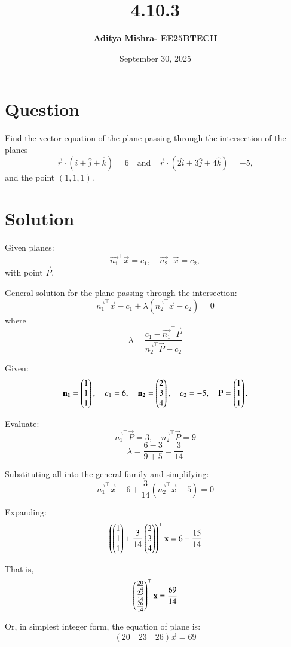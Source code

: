 \documentclass[12pt]{article}
\title{\textbf{4.10.3}}
\author{\textbf{Aditya Mishra- EE25BTECH}}
\date{September 30, 2025}
\begin{document}
\maketitle

\section*{Question}

Find the vector equation of the plane passing through the intersection of the planes
\[
\vec{r} \cdot (\hat{i} + \hat{j} + \hat{k}) = 6 \quad \text{and} \quad \vec{r} \cdot (2\hat{i} + 3\hat{j} + 4\hat{k}) = -5,
\]
and the point $(1, 1, 1)$.


\section*{Solution}

Given planes:
\[
\vec{n_1}^\top \vec{x} = c_1, \quad \vec{n_2}^\top \vec{x} = c_2,
\]
with point $\vec{P}$.


General solution for the plane passing through the intersection:
\[
\vec{n_1}^\top \vec{x} - c_1 + \lambda(\vec{n_2}^\top \vec{x} - c_2) = 0
\]
where
\[
\lambda = \frac{c_1 - \vec{n_1}^\top \vec{P}}{\vec{n_2}^\top \vec{P} - c_2}
\]

\bigskip
Given:
\[
\mathbf{n_1} = \begin{pmatrix}1 \\ 1 \\ 1\end{pmatrix},\quad c_1 = 6, \quad
\mathbf{n_2} = \begin{pmatrix}2 \\ 3 \\ 4\end{pmatrix},\quad c_2 = -5, \quad
\mathbf{P} = \begin{pmatrix}1 \\ 1 \\ 1\end{pmatrix}.
\]

Evaluate:
\[
\vec{n_1}^\top \vec{P} = 3,\quad \vec{n_2}^\top \vec{P} = 9
\]
\[
\lambda = \frac{6-3}{9+5} = \frac{3}{14}
\]

Substituting all into the general family and simplifying:
\[
\vec{n_1}^\top \vec{x} - 6 + \frac{3}{14}(\vec{n_2}^\top \vec{x} + 5) = 0
\]

Expanding:
\[
\left(\begin{pmatrix}1 \\ 1 \\ 1\end{pmatrix} + \frac{3}{14} \begin{pmatrix}2 \\ 3 \\ 4\end{pmatrix}\right)^\top \mathbf{x} = 6 - \frac{15}{14}
\]

That is,
\[
\begin{pmatrix}\frac{20}{14} \\ \frac{23}{14} \\ \frac{26}{14}\end{pmatrix}^\top \mathbf{x} = \frac{69}{14}
\]

Or, in simplest integer form, the equation of plane is:
\[
\boxed{
(20\quad 23\quad 26) \vec{x} = 69
}
\]
\end{document}
